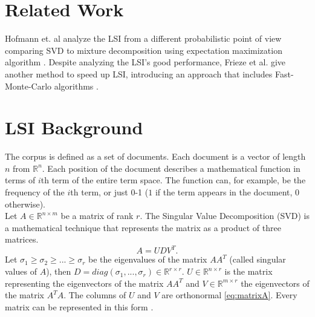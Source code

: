 \documentclass[a4paper,11pt,DIV=15]{scrartcl} %
\theoremstyle{plain}
\theoremstyle{definition}
\begin{document}
\section{Related Work}
Hofmann et. al analyze the LSI from a different probabilistic point of view comparing SVD to mixture decomposition using expectation maximization algorithm \cite{Relatedwork1}.
Despite analyzing the LSI's good performance, Frieze et al. give another method to speed up LSI, introducing an approach that includes Fast-Monte-Carlo algorithms \cite{Relatedwork2}.





 

\section{LSI Background} %
The corpus is defined as a set of documents. Each document is a vector of length $n$ from $\mathbb{R}^n$. Each position of the document describes a mathematical function in terms of $i$th term of the entire term space. The function can, for example, be the frequency of the $i$th term, or just 0-1 ($1$ if the term appears in the document, $0$ otherwise).\\
Let $A \in \mathbb{R}^{n \times m}$ be a matrix of rank $r$. The Singular Value Decomposition (SVD) is a mathematical technique that represents the matrix as a product of three matrices.
\[
A = UDV^T.
\]
Let $\sigma_1 \geq \sigma_2 \geq ...\geq \sigma_r$ be the eigenvalues of the matrix $AA^T$ (called singular values of $A$), then $D = diag(\sigma_1,...,\sigma_r) \in \mathbb{R}^{r \times r}$. $U \in \mathbb{R}^{n \times r}$ is the matrix representing the eigenvectors of the matrix $AA^T$ and $V \in \mathbb{R}^{m \times r}$ the eigenvectors of the matrix $A^TA$. The columns of $U$ and $V$ are orthonormal \ref{eq:matrixA}. Every matrix can be represented in this form \cite{strang2005}.
\end{document}
